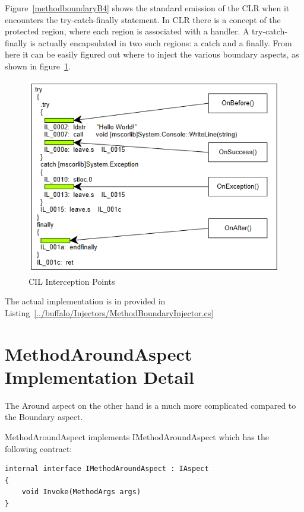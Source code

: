 Figure~\ref{methodboundaryB4} shows the standard emission of the CLR when it encounters the try-catch-finally statement. In CLR there is a concept of the protected region, where each region is associated with a handler. A try-catch-finally is actually encapsulated in two such regions: a catch and a finally. From here it can be easily figured out where to inject the various boundary aspects, as shown in figure~\ref{methodboundary02}.

\begin{figure}[H]
  \includegraphics[scale=1.0]{MethodBoundaryOverview.PNG}
  \centering
  \caption{CIL Interception Points\label{methodboundary02}}
\end{figure}

The actual implementation is in provided in Listing~\ref{../buffalo/Injectors/MethodBoundaryInjector.cs}

\section{MethodAroundAspect Implementation Detail}

The Around aspect on the other hand is a much more complicated compared to the Boundary aspect.

MethodAroundAspect implements IMethodAroundAspect which has the following contract:

\begin{lstlisting}[caption={IMethodAroundAspect Contract}, label=aroundcontract]
internal interface IMethodAroundAspect : IAspect
{
	void Invoke(MethodArgs args)
}
\end{lstlisting}

